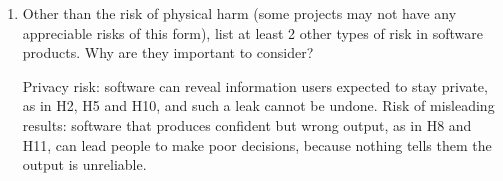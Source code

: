 \documentclass{article}
\begin{document}
\begin{enumerate}
    \item Other than the risk of physical harm (some projects may not have any
    appreciable risks of this form), list at least 2 other types of risk in
    software products. Why are they important to consider?

    Privacy risk: software can reveal
    information users expected to stay private, as in H2, H5 and H10, and
    such a leak cannot be undone. Risk of misleading results: software that
    produces confident but wrong output, as in H8 and H11, can lead people
    to make poor decisions, because nothing tells them the output is
    unreliable.
\end{enumerate}
\end{document}
